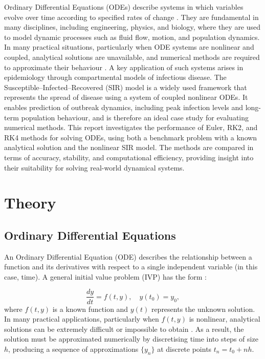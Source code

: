\documentclass{article}
\begin{document}
Ordinary Differential Equations (ODEs) describe systems in which variables evolve over time according to specified rates of change \cite{2,13}. They are fundamental in many disciplines, including engineering, physics, and biology, where they are used to model dynamic processes such as fluid flow, motion, and population dynamics. In many practical situations, particularly when ODE systems are nonlinear and coupled, analytical solutions are unavailable, and numerical methods are required to approximate their behaviour \cite{1,3}.
A key application of such systems arises in epidemiology through compartmental models of infectious disease. The Susceptible--Infected--Recovered (SIR) model is a widely used framework that represents the spread of disease using a system of coupled nonlinear ODEs. It enables prediction of outbreak dynamics, including peak infection levels and long-term population behaviour, and is therefore an ideal case study for evaluating numerical methods.
This report investigates the performance of Euler, RK2, and RK4 methods for solving ODEs, using both a benchmark problem with a known analytical solution and the nonlinear SIR model. The methods are compared in terms of accuracy, stability, and computational efficiency, providing insight into their suitability for solving real-world dynamical systems.

\section{Theory}

\subsection{Ordinary Differential Equations}
An Ordinary Differential Equation (ODE) describes the relationship between a function and its derivatives with respect to a single independent variable (in this case, time). A general initial value problem (IVP) has the form \cite{2}:

\begin{equation}
\frac{dy}{dt} = f(t,y), \quad y(t_0) = y_0,
\end{equation}
where $f(t,y)$ is a known function and $y(t)$ represents the unknown solution.
In many practical applications, particularly when $f(t,y)$ is nonlinear, analytical solutions can be extremely difficult or impossible to obtain \cite{2}. As a result, the solution must be approximated numerically by discretising time into steps of size $h$, producing a sequence of approximations $\{y_n\}$ at discrete points $t_n = t_0 + nh$.
\end{document}
